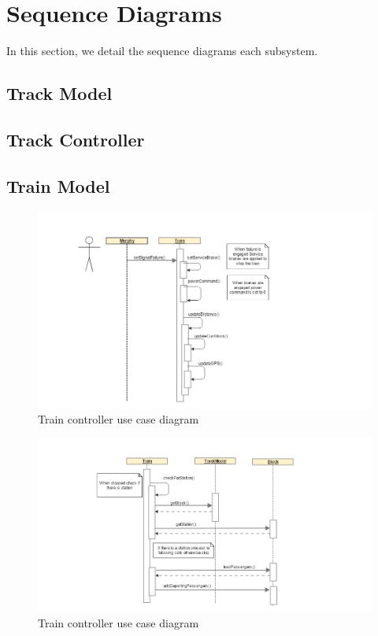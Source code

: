 \documentclass[]{article}
\begin{document}
\section{Sequence Diagrams}
In this section, we detail the sequence diagrams each subsystem.
\subsection{Track Model}

\subsection{Track Controller}
\subsection{Train Model}

\begin{figure}[H]
	\centering
	\includegraphics[scale=.2]{train_model_sqd_toggle_signal_failure.png}
	\caption{Train controller use case diagram}
\end{figure}

\begin{figure}[H]
	\centering
	\includegraphics[scale=.2]{train_model_sqd_add_passengers.png}
	\caption{Train controller use case diagram}
\end{figure}
\end{document}
